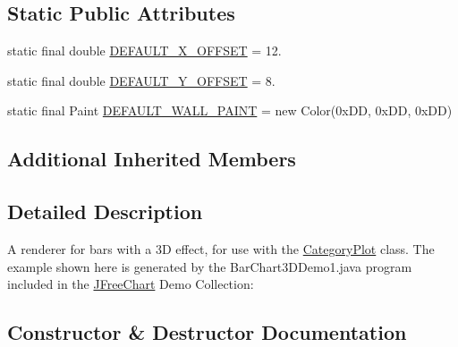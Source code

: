 \subsection*{Static Public Attributes}
\begin{DoxyCompactItemize}
\item 
static final double \mbox{\hyperlink{classorg_1_1jfree_1_1chart_1_1renderer_1_1category_1_1_bar_renderer3_d_aae94b276f56037aecc7c40ad4987147c}{D\+E\+F\+A\+U\+L\+T\+\_\+\+X\+\_\+\+O\+F\+F\+S\+ET}} = 12.
\item 
static final double \mbox{\hyperlink{classorg_1_1jfree_1_1chart_1_1renderer_1_1category_1_1_bar_renderer3_d_ac4ca0cc1267d6c60744b2764b42c178a}{D\+E\+F\+A\+U\+L\+T\+\_\+\+Y\+\_\+\+O\+F\+F\+S\+ET}} = 8.
\item 
static final Paint \mbox{\hyperlink{classorg_1_1jfree_1_1chart_1_1renderer_1_1category_1_1_bar_renderer3_d_a1772f04c3b41a44088f0f73c813c39aa}{D\+E\+F\+A\+U\+L\+T\+\_\+\+W\+A\+L\+L\+\_\+\+P\+A\+I\+NT}} = new Color(0x\+D\+D, 0x\+D\+D, 0x\+D\+D)
\end{DoxyCompactItemize}
\subsection*{Additional Inherited Members}


\subsection{Detailed Description}
A renderer for bars with a 3D effect, for use with the \mbox{\hyperlink{}{Category\+Plot}} class. The example shown here is generated by the {\ttfamily Bar\+Chart3\+D\+Demo1.\+java} program included in the \mbox{\hyperlink{classorg_1_1jfree_1_1chart_1_1_j_free_chart}{J\+Free\+Chart}} Demo Collection\+: ~\newline
~\newline
  

\subsection{Constructor \& Destructor Documentation}
\mbox{\label{classorg_1_1jfree_1_1chart_1_1renderer_1_1category_1_1_bar_renderer3_d_a62f8e30b4efb701840a2d6e4d3ac60b4}} 
